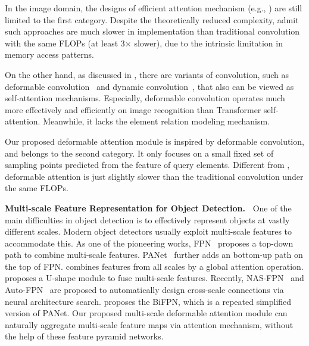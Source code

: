 In the image domain, the designs of efficient attention mechanism (e.g., \citet{parmar2018image,child2019generating,huang2019ccnet,ho2019axial,wang2020axial,hu2019local,ramachandran2019stand}) are still limited to the first category. Despite the theoretically reduced complexity, \citet{ramachandran2019stand,hu2019local} admit such approaches are much slower in implementation than traditional convolution with the same FLOPs (at least 3$\times$ slower), due to the intrinsic limitation in memory access patterns.

On the other hand, as discussed in \citet{zhu2019empirical}, there are variants of
convolution, such as deformable convolution~\citep{dai2017deformable,zhu2019deformable} and dynamic convolution~\citep{wu2019pay}, that also can be viewed as self-attention mechanisms. Especially, deformable convolution operates much more effectively
and efficiently on image recognition than Transformer self-attention. Meanwhile, it lacks the element relation modeling mechanism.

Our proposed deformable attention module is inspired by deformable convolution, and belongs to the second category. It only focuses on a small fixed set of sampling points predicted from the feature of query elements.
Different from \citet{ramachandran2019stand,hu2019local}, deformable attention is just slightly slower than the traditional convolution under the same FLOPs.

\textbf{Multi-scale Feature Representation for Object Detection.~}
One of the main difficulties in object detection is to effectively represent objects at vastly different scales. Modern object detectors usually exploit multi-scale features to accommodate this.
As one of the pioneering works, FPN~\citep{lin2017feature} proposes a top-down path to combine multi-scale features. PANet~\citep{liu2018path} further adds an bottom-up path on the top of FPN. \citet{kong2018deep} combines features from all scales by a global attention operation. \citet{zhao2019m2det} proposes a U-shape module to fuse multi-scale features. Recently, NAS-FPN~\citep{ghiasi2019fpn} and Auto-FPN~\citep{xu2019auto} are proposed to automatically design cross-scale connections via neural architecture search. \citet{tan2020efficientdet} proposes the BiFPN, which is a repeated simplified version of PANet.
Our proposed multi-scale deformable attention module can naturally aggregate multi-scale feature maps via attention mechanism, without the help of these feature pyramid networks.

